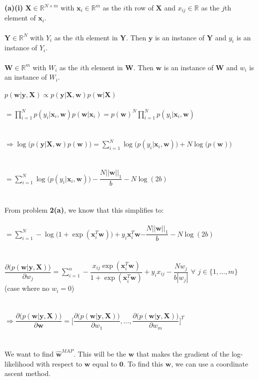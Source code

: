 \documentclass[submit]{harvardml}
\newcommand{\R}{\mathbb{R}}
\begin{document}
\textbf{(a)(i)} $\mathbf{X}\in\R^{N\times m}$ with $\mathbf{x}_i\in\R^m$ as the $i$th row of $\mathbf{X}$ and $x_{ij}\in\R$ as the $j$th element of $\mathbf{x}_i$.\\\\
$\mathbf{Y}\in\R^N$ with $Y_i$ as the $i$th element in $\mathbf{Y}$. Then $\mathbf{y}$ is an instance of $\mathbf{Y}$ and $y_i$ is an instance of $Y_i$.\\\\
$\mathbf{W}\in\R^m$ with $W_i$ as the $i$th element in $\mathbf{W}$. Then $\mathbf{w}$ is an instance of $\mathbf{W}$ and $w_i$ is an instance of $W_i$.\\\\
$p(\mathbf{w}|\mathbf{y},\mathbf{X})\propto p(\mathbf{y}|\mathbf{X},\mathbf{w})p(\mathbf{w}|\mathbf{X})$\\\\
$=\displaystyle\prod_{i=1}^{N}p(y_i|\mathbf{x}_i,\mathbf{w})p(\mathbf{w}|\mathbf{x}_i)=p(\mathbf{w})^N\displaystyle\prod_{i=1}^{N}p(y_i|\mathbf{x}_i,\mathbf{w})$\\\\\\
$\Rightarrow\log\big(p(\mathbf{y}|\mathbf{X},\mathbf{w})p(\mathbf{w})\big)=\displaystyle\sum_{i=1}^{N}\log\big(p(y_i|\mathbf{x}_i,\mathbf{w})\big)+N\log\big(p(\mathbf{w})\big)$\\\\\\
$=\displaystyle\sum_{i=1}^{N}\log\big(p(y_i|\mathbf{x}_i,\mathbf{w})\big)-\dfrac{N||\mathbf{w}||_1}{b}-N\log(2b)$\\\\\\
From problem \textbf{2(a)}, we know that this simplifies to:\\\\
$=\displaystyle\sum_{i=1}^{N}-\log\big(1+\exp(\mathbf{x}_i^T\mathbf{w})\big)+y_i\mathbf{x}_i^T\mathbf{w}\mathbf-\dfrac{N||\mathbf{w}||_1}{b}-N\log(2b)$\\\\\\
$\dfrac{\partial\big(p(\mathbf{w}|\mathbf{y},\mathbf{X})\big)}{\partial w_j}=\displaystyle\sum_{i=1}^{n}-\dfrac{x_{ij}\exp(\mathbf{x}_i^T\mathbf{w})}{1+\exp(\mathbf{x}_i^T\mathbf{w})}+y_ix_{ij}-\dfrac{Nw_j}{b|w_j|}$ $\forall$ $j\in\{1,...,m\}$ (case where no $w_i=0$)\\\\\\
$\Rightarrow\dfrac{\partial\big(p(\mathbf{w}|\mathbf{y},\mathbf{X})\big)}{\partial \mathbf{w}}=\Bigg[\dfrac{\partial\big(p(\mathbf{w}|\mathbf{y},\mathbf{X})\big)}{\partial w_1},...,\dfrac{\partial\big(p(\mathbf{w}|\mathbf{y},\mathbf{X})\big)}{\partial w_m}\Bigg]^T$\\\\\\
We want to find $\mathbf{\hat w}^{MAP}$. This will be the $\mathbf{w}$ that makes the gradient of the log-likelihood with respect to $\mathbf{w}$ equal to $\mathbf{0}$. To find this $\mathbf{w}$, we can use a coordinate ascent method.\\\\
\end{document}
